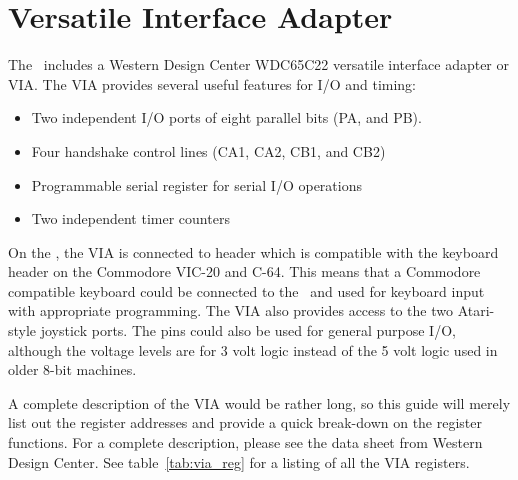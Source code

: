 \chapter{Versatile Interface Adapter}

The \jr\ includes a Western Design Center WDC65C22 versatile interface adapter or VIA. The VIA provides several useful features for I/O and timing:

\begin{itemize}
    \item Two independent I/O ports of eight parallel bits (PA, and PB).

    \item Four handshake control lines (CA1, CA2, CB1, and CB2)

    \item Programmable serial register for serial I/O operations

    \item Two independent timer counters
\end{itemize}

On the \jr, the VIA is connected to header which is compatible with the keyboard header on the Commodore VIC-20 and C-64. This means that a Commodore compatible keyboard could be connected to the \jr\ and used for keyboard input with appropriate programming. The VIA also provides access to the two Atari-style joystick ports. The pins could also be used for general purpose I/O, although the voltage levels are for 3 volt logic instead of the 5 volt logic used in older 8-bit machines.

A complete description of the VIA would be rather long, so this guide will merely list out the register addresses and provide a quick break-down on the register functions. For a complete description, please see the data sheet from Western Design Center. See table~\ref{tab:via_reg} for a listing of all the VIA registers.

